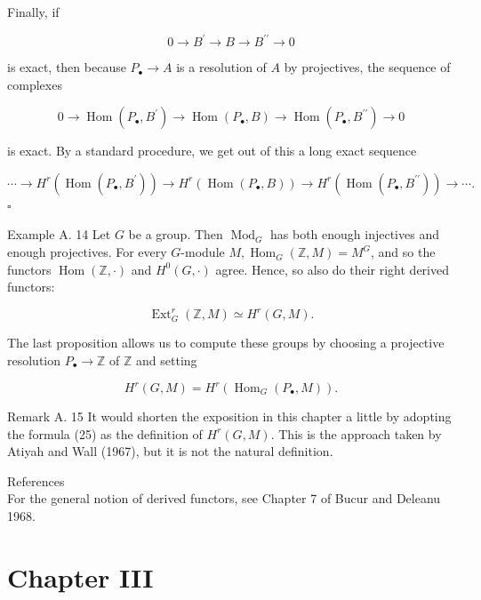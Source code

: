 \documentclass[10pt]{article}
\begin{document}
Finally, if

$$
0 \rightarrow B^{\prime} \rightarrow B \rightarrow B^{\prime \prime} \rightarrow 0
$$

is exact, then because $P_{\bullet} \rightarrow A$ is a resolution of $A$ by projectives, the sequence of complexes

$$
0 \rightarrow \operatorname{Hom}\left(P_{\bullet}, B^{\prime}\right) \rightarrow \operatorname{Hom}\left(P_{\bullet}, B\right) \rightarrow \operatorname{Hom}\left(P_{\bullet}, B^{\prime \prime}\right) \rightarrow 0
$$

is exact. By a standard procedure, we get out of this a long exact sequence

$$
\cdots \rightarrow H^{r}\left(\operatorname{Hom}\left(P_{\bullet}, B^{\prime}\right)\right) \rightarrow H^{r}\left(\operatorname{Hom}\left(P_{\bullet}, B\right)\right) \rightarrow H^{r}\left(\operatorname{Hom}\left(P_{\bullet}, B^{\prime \prime}\right)\right) \rightarrow \cdots .
$$ \(\square\)

Example A. 14 Let $G$ be a group. Then $\operatorname{Mod}_{G}$ has both enough injectives and enough projectives. For every $G$-module $M, \operatorname{Hom}_{G}(\mathbb{Z}, M)=M^{G}$, and so the functors $\operatorname{Hom}(\mathbb{Z}, \cdot)$ and $H^{0}(G, \cdot)$ agree. Hence, so also do their right derived functors:

$$
\operatorname{Ext}_{G}^{r}(\mathbb{Z}, M) \simeq H^{r}(G, M) .
$$

The last proposition allows us to compute these groups by choosing a projective resolution $P_{\bullet} \rightarrow \mathbb{Z}$ of $\mathbb{Z}$ and setting


\begin{equation*}
H^{r}(G, M)=H^{r}\left(\operatorname{Hom}_{G}\left(P_{\bullet}, M\right)\right) . \tag{25}
\end{equation*}


Remark A. 15 It would shorten the exposition in this chapter a little by adopting the formula (25) as the definition of $H^{r}(G, M)$. This is the approach taken by Atiyah and Wall (1967), but it is not the natural definition.

References\\
For the general notion of derived functors, see Chapter 7 of Bucur and Deleanu 1968.

\section*{Chapter III}
\end{document}

